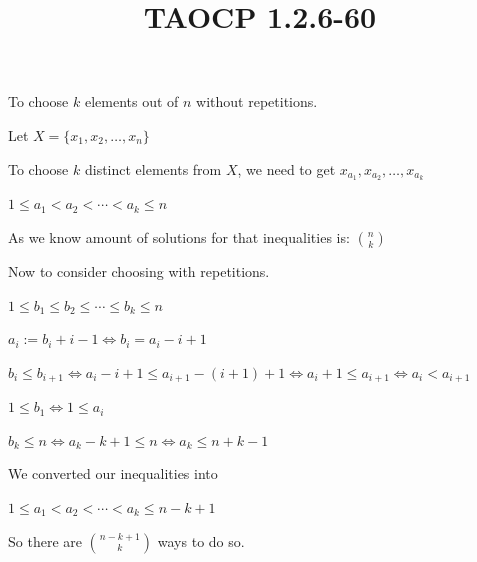 \documentclass{article}
\title{TAOCP 1.2.6\mbox{-}60}
\begin{document}
\maketitle

To choose \( k \) elements out of \( n \) without repetitions.

Let \( X = \{ x_{1}, x_{2}, \ldots, x_{n} \} \)

To choose \( k \) distinct elements from \( X \), we need to get \( x_{a_{1}}, x_{a_{2}}, \ldots, x_{a_{k}} \)

\( 1 \leq a_{1} < a_{2} < \cdots < a_{k} \leq n \)

As we know amount of solutions for that inequalities is: \( \binom{n}{k} \)

Now to consider choosing with repetitions.

\( 1 \leq b_{1} \leq b_{2} \leq \cdots \leq b_{k} \leq n \)

\( a_{i} := b_{i} + i - 1 \iff b_{i} = a_{i} - i + 1 \)

\( b_{i} \leq b_{i+1} \iff a_{i} - i + 1 \leq a_{i+1} - (i+1) + 1 \iff a_{i} + 1 \leq a_{i+1} \iff a_{i} < a_{i+1} \)

\( 1 \leq b_{1} \iff 1 \leq a_{i} \)

\( b_{k} \leq n \iff a_{k} - k + 1 \leq n \iff a_{k} \leq n + k - 1 \)

We converted our inequalities into

\( 1 \leq a_{1} < a_{2} < \cdots < a_{k} \leq n - k + 1 \)

So there are \( \binom{n-k+1}{k} \) ways to do so.
\end{document}
